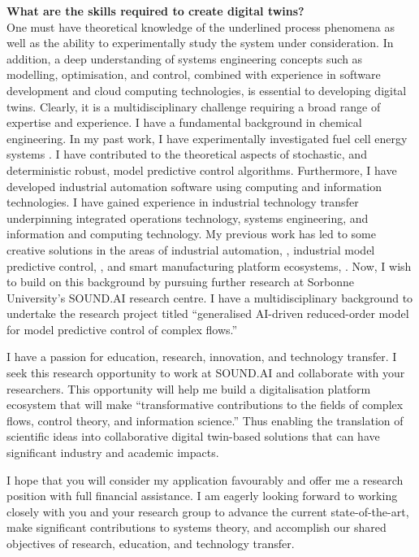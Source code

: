 \documentclass[oneside,11pt,a4paper]{article}
\begin{document}
\textbf{What are the skills required to create digital twins?}\\[0mm]
One must have theoretical knowledge of the underlined process phenomena as well as the ability to experimentally study the system under consideration. In addition, a deep understanding of systems engineering concepts such as modelling, optimisation, and control, combined with experience in software development and cloud computing technologies, is essential to developing digital twins. Clearly, it is a multidisciplinary challenge requiring a broad range of expertise and experience. I have a fundamental background in chemical engineering. In my past work, I have experimentally investigated fuel cell energy systems \cite{Lopes-2019}. I have contributed to the theoretical aspects of stochastic, \cite{PengMC-2005, ChmielewskiM-2004, ChmielewskiPM-2002-ACC} and deterministic robust, \cite{ManthanwarSP-2005-ACC, ManthanwarSP-2005-IFAC} model predictive control algorithms. Furthermore, I have developed industrial automation software using computing and information technologies. I have gained experience in industrial technology transfer underpinning integrated operations technology, systems engineering, and information and computing technology. My previous work has led to some creative solutions in the areas of industrial automation, \cite{Manthanwar-2009-DCS}, industrial model predictive control, \cite{Manthanwar-2008-MPC}, and smart manufacturing platform ecosystems, \cite{botcha2018implementing}. Now, I wish to build on this background by pursuing further research at Sorbonne University's SOUND.AI research centre. I have a multidisciplinary background to undertake the research project titled ``generalised AI-driven reduced-order model for model predictive control of complex flows.''

I have a passion for education, research, innovation, and technology transfer. I seek this research opportunity to work at SOUND.AI and collaborate with your researchers. This opportunity will help me build a digitalisation platform ecosystem that will make ``transformative contributions to the fields of complex flows, control theory, and information science.'' Thus enabling the translation of scientific ideas into collaborative digital twin-based solutions that can have significant industry and academic impacts.

I hope that you will consider my application favourably and offer me a research position with full financial assistance. I am eagerly looking forward to working closely with you and your research group to advance the current state-of-the-art, make significant contributions to systems theory, and accomplish our shared objectives of research, education, and technology transfer.\\
\end{document}
